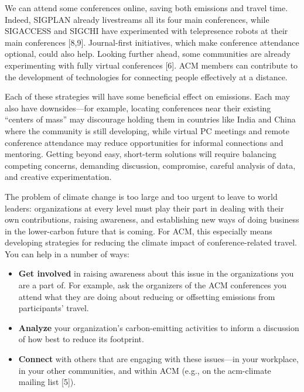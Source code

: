 \documentclass[12pt]{article}
\begin{document}
We can attend some conferences online, saving both emissions and travel
time.  Indeed, SIGPLAN already livestreams all its four main conferences,
while SIGACCESS and SIGCHI have experimented with telepresence robots at
their main conferences [8,9]. Journal-first initiatives, which make
conference attendance optional, could also help.  Looking further ahead,
some communities are already experimenting with fully virtual conferences
[6].  ACM members can contribute to the development of technologies for
connecting people effectively at a distance.

Each of these strategies will have some beneficial effect on emissions.
Each may also have downsides---for example, locating conferences near their
existing ``centers of mass'' may discourage holding them in countries like
India and China where the community is still developing, while virtual PC
meetings and remote conference attendance may reduce opportunities for
informal connections and mentoring.  Getting beyond easy, short-term
solutions will require balancing competing concerns, demanding discussion,
compromise, careful analysis of data, and creative experimentation.

The problem of climate change is too large and too urgent to leave to world
leaders: organizations at every level must play their part in dealing with
their own contributions, raising awareness, and establishing new ways of
doing business in the lower-carbon future that is coming. For ACM, this
especially means developing strategies for reducing the climate impact of
conference-related travel. You can help in a number of ways: 
\begin{itemize}
\item {\bf Get involved} in raising awareness about this issue in the
organizations you are a part of.  For example, ask the organizers of the ACM
conferences you attend what they are doing about reducing or offsetting
emissions from participants’ travel.
\item {\bf Analyze} your organization’s carbon-emitting activities to inform a
discussion of how best to reduce its footprint.
\item {\bf Connect} with others that are engaging with these issues---in
your workplace, in your other communities, and within ACM (e.g., on the
acm-climate mailing list [5]).
\end{itemize}



\end{document}
